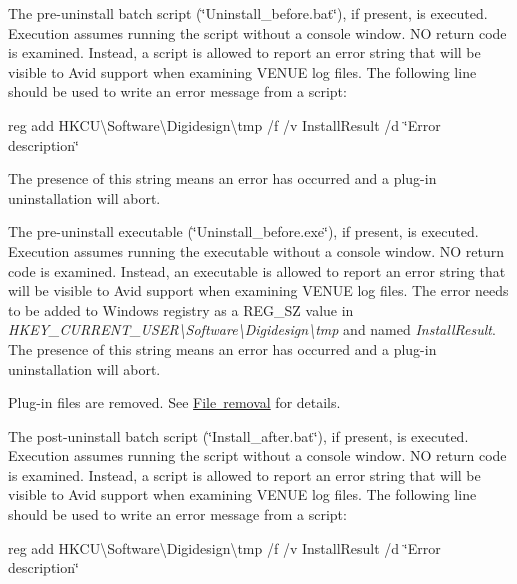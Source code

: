 \begin{DoxyEnumerate}
\item The pre-\/uninstall batch script (\char`\"{}\+Uninstall\+\_\+before.\+bat\char`\"{}), if present, is executed. Execution assumes running the script without a console window. NO return code is examined. Instead, a script is allowed to report an error string that will be visible to Avid support when examining V\+E\+N\+UE log files. The following line should be used to write an error message from a script\+:

{\ttfamily reg add H\+K\+CU\textbackslash{}Software\textbackslash{}Digidesign\textbackslash{}tmp /f /v Install\+Result /d \char`\"{}\+Error description\char`\"{}}

The presence of this string means an error has occurred and a plug-\/in uninstallation will abort.  
\item The pre-\/uninstall executable (\char`\"{}\+Uninstall\+\_\+before.\+exe\char`\"{}), if present, is executed. Execution assumes running the executable without a console window. NO return code is examined. Instead, an executable is allowed to report an error string that will be visible to Avid support when examining V\+E\+N\+UE log files. The error needs to be added to Windows registry as a {\ttfamily R\+E\+G\+\_\+\+SZ} value in {\itshape H\+K\+E\+Y\+\_\+\+C\+U\+R\+R\+E\+N\+T\+\_\+\+U\+S\+ER\textbackslash{}Software\textbackslash{}Digidesign\textbackslash{}tmp} and named {\itshape Install\+Result}. The presence of this string means an error has occurred and a plug-\/in uninstallation will abort.  
\item Plug-\/in files are removed. See \mbox{\hyperlink{a00849_subsubsection__aax_venue_guide__system_details__plugin_installation__removal}{File removal}} for details.  
\item The post-\/uninstall batch script (\char`\"{}\+Install\+\_\+after.\+bat\char`\"{}), if present, is executed. Execution assumes running the script without a console window. NO return code is examined. Instead, a script is allowed to report an error string that will be visible to Avid support when examining V\+E\+N\+UE log files. The following line should be used to write an error message from a script\+:

{\ttfamily reg add H\+K\+CU\textbackslash{}Software\textbackslash{}Digidesign\textbackslash{}tmp /f /v Install\+Result /d \char`\"{}\+Error description\char`\"{}}


\end{DoxyEnumerate}
